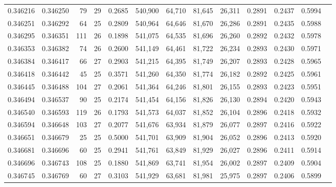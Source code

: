 \begin{tabular}{rrrrrrrrrrrrr}
0.346216 & 0.346250 &    79 &  29 &                                     0.2685 & 540,900 &  64,710 &  81,645 &  26,311 & 0.2891 & 0.2437 & 0.5994 \\
0.346251 & 0.346292 &    64 &  25 &                                     0.2809 & 540,964 &  64,646 &  81,670 &  26,286 & 0.2891 & 0.2435 & 0.5988 \\
0.346295 & 0.346351 &   111 &  26 &                                     0.1898 & 541,075 &  64,535 &  81,696 &  26,260 & 0.2892 & 0.2432 & 0.5978 \\
0.346353 & 0.346382 &    74 &  26 &                                     0.2600 & 541,149 &  64,461 &  81,722 &  26,234 & 0.2893 & 0.2430 & 0.5971 \\
0.346384 & 0.346417 &    66 &  27 &                                     0.2903 & 541,215 &  64,395 &  81,749 &  26,207 & 0.2893 & 0.2428 & 0.5965 \\
0.346418 & 0.346442 &    45 &  25 &                                     0.3571 & 541,260 &  64,350 &  81,774 &  26,182 & 0.2892 & 0.2425 & 0.5961 \\
0.346445 & 0.346488 &   104 &  27 &                                     0.2061 & 541,364 &  64,246 &  81,801 &  26,155 & 0.2893 & 0.2423 & 0.5951 \\
0.346494 & 0.346537 &    90 &  25 &                                     0.2174 & 541,454 &  64,156 &  81,826 &  26,130 & 0.2894 & 0.2420 & 0.5943 \\
0.346540 & 0.346593 &   119 &  26 &                                     0.1793 & 541,573 &  64,037 &  81,852 &  26,104 & 0.2896 & 0.2418 & 0.5932 \\
0.346594 & 0.346648 &   103 &  27 &                                     0.2077 & 541,676 &  63,934 &  81,879 &  26,077 & 0.2897 & 0.2416 & 0.5922 \\
0.346651 & 0.346679 &    25 &  25 &                                     0.5000 & 541,701 &  63,909 &  81,904 &  26,052 & 0.2896 & 0.2413 & 0.5920 \\
0.346681 & 0.346696 &    60 &  25 &                                     0.2941 & 541,761 &  63,849 &  81,929 &  26,027 & 0.2896 & 0.2411 & 0.5914 \\
0.346696 & 0.346743 &   108 &  25 &                                     0.1880 & 541,869 &  63,741 &  81,954 &  26,002 & 0.2897 & 0.2409 & 0.5904 \\
0.346745 & 0.346769 &    60 &  27 &                                     0.3103 & 541,929 &  63,681 &  81,981 &  25,975 & 0.2897 & 0.2406 & 0.5899 \\

\end{tabular}
